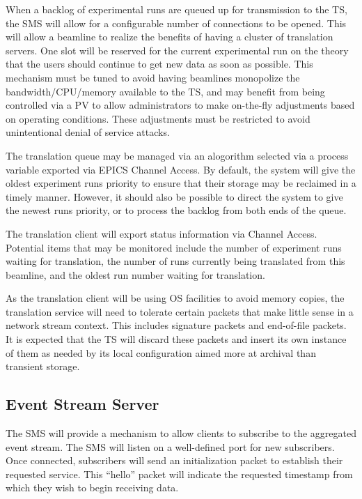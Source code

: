 When a backlog of experimental runs are queued up for transmission to the TS,
the SMS will allow for a configurable number of connections to be opened. This
will allow a beamline to realize the benefits of having a cluster of
translation servers. One slot will be reserved for the current experimental run
on the theory that the users should continue to get new data as soon as
possible. This mechanism must be tuned to avoid having beamlines monopolize
the bandwidth/CPU/memory available to the TS, and may benefit from being
controlled via a PV to allow administrators to make on-the-fly adjustments
based on operating conditions. These adjustments must be restricted to
avoid unintentional denial of service attacks.

The translation queue may be managed via an alogorithm selected via a process
variable exported via EPICS Channel Access. By default, the system will
give the oldest experiment runs priority to ensure that their storage may
be reclaimed in a timely manner. However, it should also be possible to
direct the system to give the newest runs priority, or to process the backlog
from both ends of the queue.

The translation client will export status information via Channel Access.
Potential items that may be monitored include the number of experiment runs
waiting for translation, the number of runs currently being translated from
this beamline, and the oldest run number waiting for translation.

As the translation client will be using OS facilities to avoid memory copies,
the translation service will need to tolerate certain packets that make little
sense in a network stream context. This includes signature packets and
end-of-file packets. It is expected that the TS will discard these packets and
insert its own instance of them as needed by its local configuration aimed more
at archival than transient storage.




\subsection{Event Stream Server}

The SMS will provide a mechanism to allow clients to subscribe to the
aggregated event stream. The SMS will listen on a well-defined port for new
subscribers. Once connected, subscribers will send an initialization packet to
establish their requested service. This ``hello'' packet will indicate
the requested timestamp from which they wish to begin receiving data.

